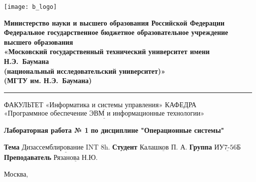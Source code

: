 \thispagestyle{empty}

\noindent \begin{minipage}{0.15\textwidth}
	\texttt{[image: b\_logo]}
\end{minipage}
\noindent\begin{minipage}{0.9\textwidth}\centering
	\textbf{Министерство науки и высшего образования Российской Федерации}\\
	\textbf{Федеральное государственное бюджетное образовательное учреждение высшего образования}\\
	\textbf{«Московский государственный технический университет имени Н.Э.~Баумана}\\
	\textbf{(национальный исследовательский университет)»}\\
	\textbf{(МГТУ им. Н.Э.~Баумана)}
\end{minipage}

\noindent\rule{18cm}{3pt}
\newline\newline
\noindent ФАКУЛЬТЕТ $\underline{\text{«Информатика и системы управления»}}$ \newline\newline
\noindent КАФЕДРА $\underline{\text{«Программное обеспечение ЭВМ и информационные технологии»}}$\newline\newline\newline\newline\newline\newline\newline


\begin{center}
	\noindent\begin{minipage}{1.3\textwidth}\centering
	\Large\textbf{  Лабораторная работа № 1}\newline
	\textbf{по дисциплине "Операционные системы"}\newline\newline\newline
	\end{minipage}
\end{center}

\noindent\textbf{Тема} $\underline{\text{Дизассемблирование INT 8h.}}$\newline\newline
\noindent\textbf{Студент} $\underline{\text{Калашков П. А.}}$\newline\newline
\noindent\textbf{Группа} $\underline{\text{ИУ7-56Б}}$\newline\newline
\noindent\textbf{Преподаватель} $\underline{\text{Рязанова Н.Ю.}}$\newline

\begin{center}
	\vfill
	Москва,~\the\year
\end{center}
\clearpage

